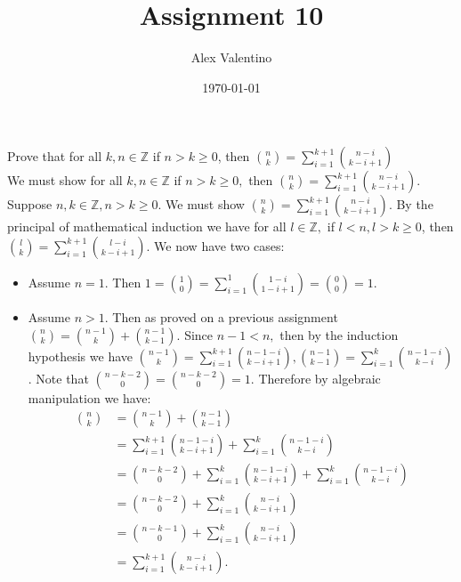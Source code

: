 \documentclass[12pt, letterpaper]{article}
\date{\today}
\author{Alex Valentino}
\title{Assignment 10}
\newcommand{\Z}{\mathbb{Z}}
\begin{document}
	Prove that for all $k,n \in \mathbb{Z}$ if $n > k \geq 0$,  then $\binom{n}{k} = \sum_{i=1}^{k+1} \binom{n-i}{k-i+1}$\\
	
	We must show for all $k,n \in \Z$ if $n>k\geq 0,$ then $\binom{n}{k} = \sum_{i=1}^{k+1} \binom{n-i}{k-i+1}$. Suppose $n,k \in \Z, n>k\geq 0$.  We must show $\binom{n}{k} = \sum_{i=1}^{k+1} \binom{n-i}{k-i+1}$.  By the principal of mathematical induction we have for all $l \in \Z,$ if $l < n,l > k \geq 0$, then $\binom{l}{k} = \sum_{i=1}^{k+1} \binom{l-i}{k-i+1}.$  We now have two cases:
	\begin{itemize}
		\item Assume $n=1.$ Then $1= \binom{1}{0} = \sum^1_{i=1}\binom{1-i}{1-i+1} = \binom{0}{0} = 1.$
		\item Assume $n > 1.$ Then as proved on a previous assignment $\binom{n}{k} = \binom{n-1}{k} + \binom{n-1}{k-1}.$  Since $n-1 < n,$ then by the induction hypothesis we have $\binom{n-1}{k} = \sum^{k+1}_{i=1} \binom{n-1-i}{k-i+1},\binom{n-1}{k-1} =  \sum^{k}_{i=1} \binom{n-1-i}{k-i}$.  Note that $\binom{n-k-2}{0} = \binom{n-k-2}{0} = 1.$  Therefore by algebraic manipulation we have:
		\begin{align*}
			\binom{n}{k} &= \binom{n-1}{k} + \binom{n-1}{k-1}\\
			&= \sum^{k+1}_{i=1} \binom{n-1-i}{k-i+1} + \sum^{k}_{i=1} \binom{n-1-i}{k-i}\\
			&= \binom{n-k-2}{0} + \sum^{k}_{i=1} \binom{n-1-i}{k-i+1} + \sum^{k}_{i=1} \binom{n-1-i}{k-i}\\
			&= \binom{n-k-2}{0} + \sum^{k}_{i=1} \binom{n-i}{k-i+1}\\
			&= \binom{n-k-1}{0} + \sum^{k}_{i=1} \binom{n-i}{k-i+1}\\
			&= \sum^{k+1}_{i=1} \binom{n-i}{k-i+1}.
		\end{align*}
\end{itemize}	 
\end{document}
